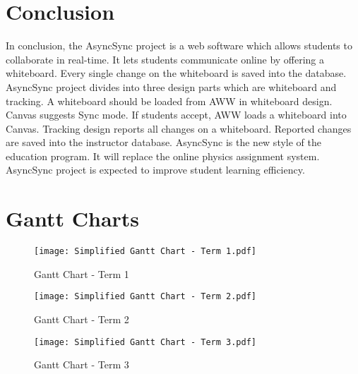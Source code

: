 \documentclass[onecolumn, draftclsnofoot,10pt, compsoc]{IEEEtran}
\begin{document}
\section{Conclusion}

	In conclusion, the AsyncSync project is a web software which allows students to collaborate in real-time. It lets students communicate online by offering a whiteboard. Every single change on the whiteboard is saved into the database. AsyncSync project divides into three design parts which are whiteboard and tracking. A whiteboard should be loaded from AWW in whiteboard design. Canvas suggests Sync mode. If students accept, AWW loads a whiteboard into Canvas. Tracking design reports all changes on a whiteboard. Reported changes are saved into the instructor database. AsyncSync is the new style of the education program. It will replace the online physics assignment system. AsyncSync project is expected to improve student learning efficiency.

\section{Gantt Charts}

	\begin{figure}[H]
		\begin{center}
			\caption{Gantt Chart - Term 1}
			\texttt{[image: Simplified Gantt Chart - Term 1.pdf]}
		\end{center}
	\end{figure}


	\begin{figure}[H]
		\begin{center}
			\caption{Gantt Chart - Term 2}
			\texttt{[image: Simplified Gantt Chart - Term 2.pdf]}
		\end{center}
	\end{figure}


	\begin{figure}[H]
		\begin{center}
			\caption{Gantt Chart - Term 3}
			\texttt{[image: Simplified Gantt Chart - Term 3.pdf]}
		\end{center}
	\end{figure}
\end{document}

